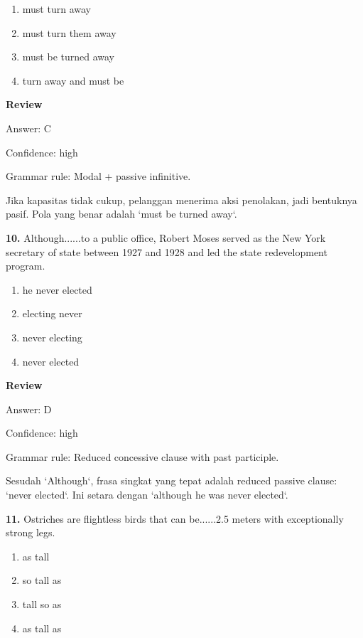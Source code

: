 \documentclass[12pt]{article}
\begin{document}
\begin{enumerate}[label=(\Alph*),leftmargin=*,itemsep=0.2em]
\item must turn away
\item must turn them away
\item must be turned away
\item turn away and must be
\end{enumerate}
\par
\begingroup
\setlength{\parskip}{0pt}
\setlength{\parindent}{0pt}
\textbf{Review}\par
Answer: C\par
Confidence: high\par
Grammar rule: Modal + passive infinitive.\par
Jika kapasitas tidak cukup, pelanggan menerima aksi penolakan, jadi bentuknya pasif. Pola yang benar adalah `must be turned away`.\par
\endgroup
\par
\vspace{0.25\baselineskip}
\noindent\textbf{10.} Although......to a public office, Robert Moses served as the New York secretary of state between 1927 and 1928 and led the state redevelopment program.
\begin{enumerate}[label=(\Alph*),leftmargin=*,itemsep=0.2em]
\item he never elected
\item electing never
\item never electing
\item never elected
\end{enumerate}
\par
\begingroup
\setlength{\parskip}{0pt}
\setlength{\parindent}{0pt}
\textbf{Review}\par
Answer: D\par
Confidence: high\par
Grammar rule: Reduced concessive clause with past participle.\par
Sesudah `Although`, frasa singkat yang tepat adalah reduced passive clause: `never elected`. Ini setara dengan `although he was never elected`.\par
\endgroup
\par
\vspace{0.25\baselineskip}
\noindent\textbf{11.} Ostriches are flightless birds that can be......2.5 meters with exceptionally strong legs.
\begin{enumerate}[label=(\Alph*),leftmargin=*,itemsep=0.2em]
\item as tall
\item so tall as
\item tall so as
\item as tall as
\end{enumerate}
\end{document}
